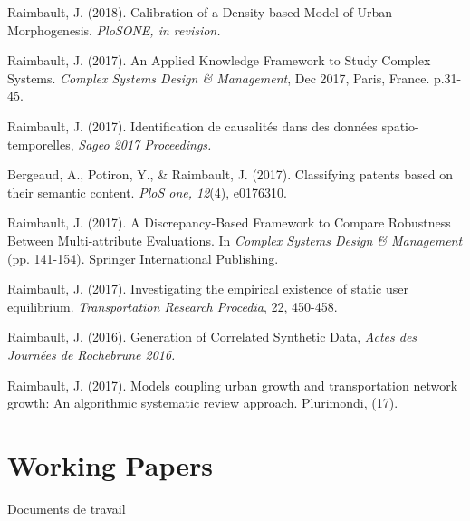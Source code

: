\bigskip


\noindent Raimbault, J. (2018). Calibration of a Density-based Model of Urban Morphogenesis. \textit{PloSONE, in revision.}

\bigskip

\noindent Raimbault, J. (2017). An Applied Knowledge Framework to Study Complex Systems.
\textit{Complex Systems Design \& Management}, Dec 2017, Paris, France. p.31-45.

\bigskip

\noindent Raimbault, J. (2017). Identification de causalités dans des données spatio-temporelles, \textit{Sageo 2017 Proceedings.}




\bigskip

\noindent Bergeaud, A., Potiron, Y., \& Raimbault, J. (2017). Classifying patents based on their semantic content. \textit{PloS one, 12}(4), e0176310.

\bigskip

\noindent Raimbault, J. (2017). A Discrepancy-Based Framework to Compare Robustness Between Multi-attribute Evaluations. In \textit{Complex Systems Design \& Management} (pp. 141-154). Springer International Publishing. 

\bigskip

\noindent Raimbault, J. (2017). Investigating the empirical existence of static user equilibrium. \textit{Transportation Research Procedia}, 22, 450-458. 


\bigskip


\noindent Raimbault, J. (2016). Generation of Correlated Synthetic Data, \textit{Actes des Journ{\'e}es de Rochebrune 2016.}


\bigskip

\noindent Raimbault, J. (2017). Models coupling urban growth and transportation network growth: An algorithmic systematic review approach. Plurimondi, (17).




\section*{Working Papers}{Documents de travail}



